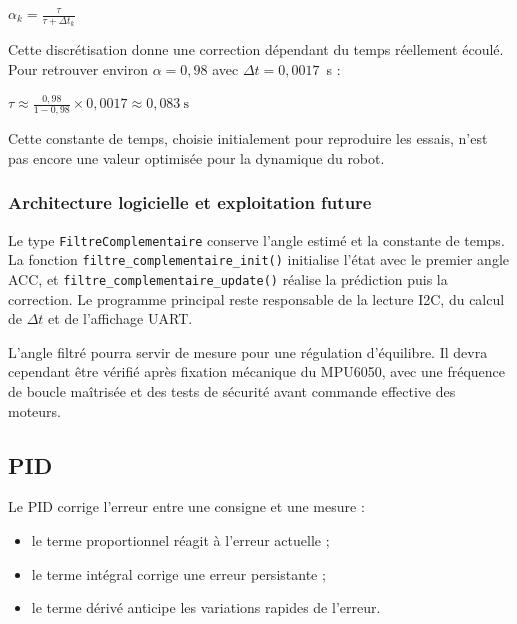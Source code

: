 \documentclass[11pt,a4paper]{article}
\begin{document}
	\begin{center}
		\(\displaystyle \alpha_k=\frac{\tau}{\tau+\Delta t_k}\)
	\end{center}
	
	Cette discrétisation donne une correction dépendant du temps réellement écoulé. Pour retrouver environ \(\alpha=0{,}98\) avec \(\Delta t=0{,}0017\)~s :
	
	\begin{center}
		\(\displaystyle \tau\approx\frac{0{,}98}{1-0{,}98}\times0{,}0017 \approx 0{,}083\ \mathrm{s}\)
	\end{center}
	
	Cette constante de temps, choisie initialement pour reproduire les essais, n'est pas encore une valeur optimisée pour la dynamique du robot.
	
	\subsubsection*{Architecture logicielle et exploitation future}
	
	Le type \texttt{FiltreComplementaire} conserve l'angle estimé et la constante de temps. La fonction \texttt{filtre\_complementaire\_init()} initialise l'état avec le premier angle ACC, et \texttt{filtre\_complementaire\_update()} réalise la prédiction puis la correction. Le programme principal reste responsable de la lecture I2C, du calcul de \(\Delta t\) et de l'affichage UART.
	
	L'angle filtré pourra servir de mesure pour une régulation d'équilibre. Il devra cependant être vérifié après fixation mécanique du MPU6050, avec une fréquence de boucle maîtrisée et des tests de sécurité avant commande effective des moteurs.
	
	\subsection*{PID}
	
	Le PID corrige l'erreur entre une consigne et une mesure :
	
	\begin{itemize}
		\item le terme proportionnel réagit à l'erreur actuelle ;
		\item le terme intégral corrige une erreur persistante ;
		\item le terme dérivé anticipe les variations rapides de l'erreur.
	\end{itemize}
	
\end{document}
